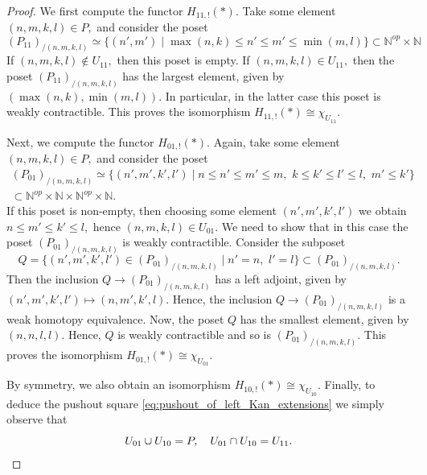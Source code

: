 \documentclass[11pt,leqno]{amsart}
\numberwithin{equation}{section}
\def\N{\mathbb{N}}
\begin{document}
\begin{proof}We first compute the functor $H_{11,!}(\ast).$ Take some element $(n,m,k,l)\in P,$ and consider the poset 
\begin{equation*}
(P_{11})_{/(n,m,k,l)}\simeq \{(n',m')\mid \max(n,k)\leq n'\leq m'\leq \min(m,l)\}\subset\N^{op}\times \N		
\end{equation*} 
If $(n,m,k,l)\not\in U_{11},$ then this poset is empty. If $(n,m,k,l)\in U_{11},$ then the poset $(P_{11})_{/(n,m,k,l)}$ has the largest element, given by $(\max(n,k),\min(m,l)).$ In particular, in the latter case this poset is weakly contractible. This proves the isomorphism $H_{11,!}(\ast)\cong \chi_{U_{11}}.$

Next, we compute the functor $H_{01,!}(\ast).$ Again, take some element $(n,m,k,l)\in P,$ and consider the poset 
\begin{multline*}
(P_{01})_{/(n,m,k,l)}\simeq \{(n',m',k',l')\mid n\leq n'\leq m'\leq m,\,\,k\leq k'\leq l'\leq l,\,\,m'\leq k'\}\\
\subset\N^{op}\times \N\times\N^{op}\times\N.		
\end{multline*} 
If this poset is non-empty, then choosing some element $(n',m',k',l')$ we obtain $n\leq m'\leq k'\leq l,$ hence $(n,m,k,l)\in U_{01}.$ We need to show that in this case the poset $(P_{01})_{/(n,m,k,l)}$ is weakly contractible. Consider the subposet
\begin{equation*}
Q=\{(n',m',k',l')\in (P_{01})_{/(n,m,k,l)}\mid n'=n,\,\,l'=l \}\subset (P_{01})_{/(n,m,k,l)}.
\end{equation*}
Then the inclusion $Q\to (P_{01})_{/(n,m,k,l)}$ has a left adjoint, given by $(n',m',k',l')\mapsto (n,m',k',l).$ Hence, the inclusion $Q\to (P_{01})_{/(n,m,k,l)}$ is a weak homotopy equivalence. Now, the poset $Q$ has the smallest element, given by $(n,n,l,l).$ Hence, $Q$ is weakly contractible and so is $(P_{01})_{/(n,m,k,l)}.$ This proves the isomorphism $H_{01,!}(\ast)\cong \chi_{U_{01}}.$

By symmetry, we also obtain an isomorphism  $H_{10,!}(\ast)\cong \chi_{U_{10}}.$ Finally, to deduce the pushout square \eqref{eq:pushout_of_left_Kan_extensions} we simply observe that \begin{equation*}
U_{01}\cup U_{10} = P,\quad U_{01}\cap U_{10} = U_{11}.\qedhere
\end{equation*}
\end{proof}
\end{document}
